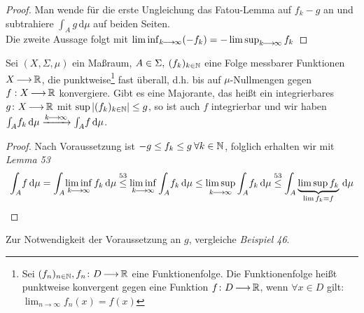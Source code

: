 \documentclass[skript.tex]{subfiles}
\begin{document}
		\begin{proof}
			Man wende für die erste Ungleichung das Fatou-Lemma auf $f_k-g$ an und subtrahiere $\int_A \! g \, \mathrm{d}\mu$ auf beiden Seiten. \\
			Die zweite Aussage folgt mit $\liminf_{k\kern -1pt \longrightarrow \kern -1pt\infty}(-f_k)= -\limsup_{k\kern -1pt \longrightarrow \kern -1pt\infty} f_k$
		\end{proof}

		\begin{theorem}
		Sei $(X,\Sigma,\mu)$ ein Maßraum, $A\in\Sigma, \: (f_k)_{k\in\mathbb{N}}$ eine Folge messbarer Funktionen $X\kern -1pt \longrightarrow \kern -1pt\mathbb{R}$, die punktweise\footnote{Sei $(f_n)_{n\in\mathbb{N}}, f_n\colon D\kern -1pt \longrightarrow \kern -1pt \mathbb{R}$ eine Funktionenfolge. Die Funktionenfolge heißt punktweise konvergent gegen eine Funktion $f\colon D\kern -1pt \longrightarrow \kern -1pt \mathbb{R}$, wenn $\forall x \in D$ gilt: $\lim_{n\to\infty} f_n(x) = f(x)$} fast überall, d.h. bis auf $\mu$-Nullmengen gegen $f:X\kern -1pt \longrightarrow \kern -1pt\mathbb{R}$ konvergiere. Gibt es eine Majorante, das heißt ein integrierbares $g\colon X\kern -1pt \longrightarrow \kern -1pt\mathbb{R}$ mit $\sup|(f_k)_{k\in\mathbb{N}}|\leq g$, so ist auch $f$ integrierbar und wir haben $\int_A \! f_k \, \mathrm{d}\mu \xrightarrow{k\kern -1pt \longrightarrow \kern -1pt\infty}\int_A \! f \, \mathrm{d}\mu$.
		\end{theorem}

		\begin{proof}
			Nach Voraussetzung ist $-g\leq f_k\leq g \: \forall k\in\mathbb{N}$, folglich erhalten wir mit \textit{Lemma 53}
			\begin{equation*}
			\int_A \! f \, \mathrm{d}\mu = \int_A \! \liminf\limits_{k\kern -1pt \longrightarrow \kern -1pt\infty} f_k \, \mathrm{d}\mu \stackrel{53}\leq \liminf\limits_{k\kern -1pt \longrightarrow \kern -1pt\infty} \int_A \! f_k \, \mathrm{d}\mu \leq \limsup\limits_{k\kern -1pt \longrightarrow \kern -1pt\infty} \int_A \! f_k \, \mathrm{d}\mu \stackrel{53}\leq \int_A \underbrace{\limsup f_k}_{\lim f_k = f} \, \mathrm{d}\mu
			\end{equation*}
		\end{proof}
		Zur Notwendigkeit der Voraussetzung an $g$, vergleiche \textit{Beispiel 46}.
\end{document}
